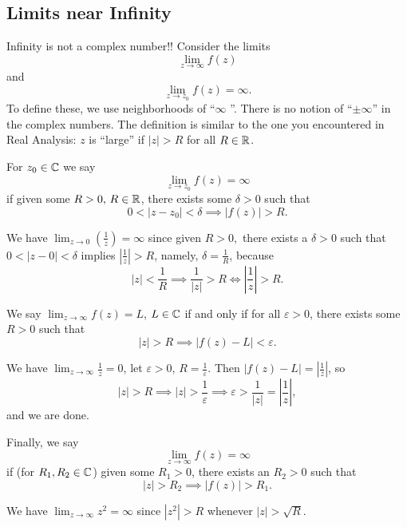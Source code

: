 \subsection{Limits near Infinity}
Infinity is not a complex number!! Consider the limits \[
    \lim_{z\to \infty}f(z)
\]
and \[
    \lim_{z\to z_0}f(z)=\infty.
\] To define these, we use neighborhoods of ``$\infty$ ''. There is no notion of ``$\pm\infty$'' in the complex numbers. The definition is similar to the one you encountered in Real Analysis: $z$ is ``large'' if $|z|>R$ for all $R \in \mathbb{R}$.
\begin{definition}
    For $z_0\in \mathbb{C}$ we say \[
        \lim_{z\to z_0}f(z)=\infty
    \]
    if given some $R>0, \, R \in \mathbb{R}$, there exists some $\delta > 0$ such that \[
        0<|z-z_0|<\delta \implies |f(z)|>R.
    \]
\end{definition}
\begin{example}
    We have $\lim_{z\to 0}(\frac{1}{z})=\infty$ since given $R>0,$ there exists a $\delta > 0$ such that $0<|z-0|<\delta$ implies $|\frac{1}{z}|>R$, namely, $\delta = \frac{1}{R}$, because
    \begin{equation*}
        |z|<\frac{1}{R}\implies \frac{1}{|z|}>R\iff \left| \frac{1}{z} \right| >R.
    \end{equation*}
\end{example}
\begin{definition}
    We say $\lim_{z\to \infty}f(z)=L$, $L\in \mathbb{C}$ if and only if for all $\varepsilon >0$, there exists some $R>0$ such that \[
        |z|>R \implies |f(z)-L|<\varepsilon.
    \]
\end{definition}
\begin{example}
    We have $\lim_{z\to \infty}\frac{1}{z}=0$, let $\varepsilon>0$, $R=\frac{1}{\varepsilon}$. Then $|f(z)-L|=\left| \frac{1}{z} \right| $, so \[
    |z|>R \implies |z|>\frac{1}{\varepsilon}\implies \varepsilon>\frac{1}{|z|}=\left| \frac{1}{z} \right| ,
    \] and we are done.
\end{example}
\begin{definition}
    Finally, we say \[
        \lim_{z\to \infty}f(z)=\infty
    \]
    if (for $R_1,R_2 \in \mathbb{C}$) given some $R_1>0$, there exists an $R_2>0$ such that \[
        |z|>R_2 \implies |f(z)|>R_1.
    \]
\end{definition}
\begin{example}
    We have $\lim_{z\to \infty}z^2=\infty$ since $|z^2|>R$ whenever $|z|>\sqrt{R} $.
\end{example}

